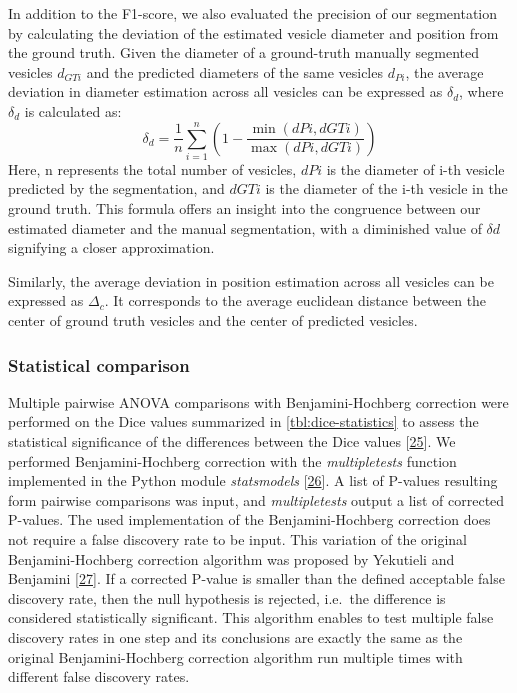 In addition to the F1-score, we also evaluated the precision of our segmentation by calculating the deviation of the estimated vesicle diameter and position from the ground truth.
Given the diameter of a ground-truth manually segmented vesicles \(d_{GTi}\) and the predicted diameters of the same vesicles \(d_{Pi}\), the average deviation in diameter estimation across all vesicles can be expressed as \(\delta_d\), where \(\delta_d\) is calculated as:
\begin{equation}\delta_d = \frac{1}{n} \sum_{i=1}^{n} \left( 1 - \frac{\min(dPi, dGTi)}{\max(dPi, dGTi)} \right)\label{eq:delta_d-equation}\end{equation}
Here, n represents the total number of vesicles, \(dPi\) is the diameter of i-th vesicle predicted by the segmentation, and \(dGTi\) is the diameter of the i-th vesicle in the ground truth.
This formula offers an insight into the congruence between our estimated diameter and the manual segmentation, with a diminished value of \(\delta d\) signifying a closer approximation.

Similarly, the average deviation in position estimation across all vesicles can be expressed as \(\Delta_c\).
It corresponds to the average euclidean distance between the center of ground truth vesicles and the center of predicted vesicles.

\hypertarget{statistical-comparison}{%
\subsubsection{Statistical comparison}\label{statistical-comparison}}

Multiple pairwise ANOVA comparisons with Benjamini-Hochberg correction were performed on the Dice values summarized in \ref{tbl:dice-statistics} to assess the statistical significance of the differences between the Dice values {[}\protect\hyperlink{ref-UeFCwwR7}{25}{]}.
We performed Benjamini-Hochberg correction with the \emph{multipletests} function implemented in the Python module \emph{statsmodels} {[}\protect\hyperlink{ref-15kEEkiul}{26}{]}.
A list of P-values resulting form pairwise comparisons was input, and \emph{multipletests} output a list of corrected P-values.
The used implementation of the Benjamini-Hochberg correction does not require a false discovery rate to be input.
This variation of the original Benjamini-Hochberg correction algorithm was proposed by Yekutieli and Benjamini {[}\protect\hyperlink{ref-ibSnzEjI}{27}{]}.
If a corrected P-value is smaller than the defined acceptable false discovery rate, then the null hypothesis is rejected, i.e.~the difference is considered statistically significant.
This algorithm enables to test multiple false discovery rates in one step and its conclusions are exactly the same as the original Benjamini-Hochberg correction algorithm run multiple times with different false discovery rates.

